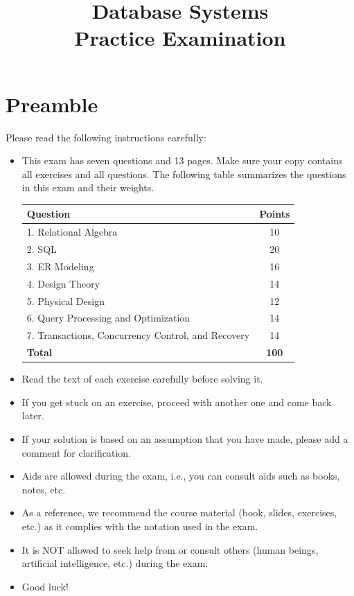 \documentclass[11pt,a4paper]{article}
\title{\textbf{Database Systems\\Practice Examination}}
\author{}
\date{}
\begin{document}
\maketitle
\thispagestyle{empty}

\section*{Preamble}

Please read the following instructions carefully:

\begin{itemize}
\item This exam has seven questions and 13 pages. Make sure your copy contains all exercises and all questions. The following table summarizes the questions in this exam and their weights.

\begin{center}
\begin{tabular}{|l|c|}
\hline
\textbf{Question} & \textbf{Points} \\
\hline
1. Relational Algebra & 10 \\
2. SQL & 20 \\
3. ER Modeling & 16 \\
4. Design Theory & 14 \\
5. Physical Design & 12 \\
6. Query Processing and Optimization & 14 \\
7. Transactions, Concurrency Control, and Recovery & 14 \\
\hline
\textbf{Total} & \textbf{100} \\
\hline
\end{tabular}
\end{center}

\item Read the text of each exercise carefully before solving it.
\item If you get stuck on an exercise, proceed with another one and come back later.
\item If your solution is based on an assumption that you have made, please add a comment for clarification.
\item Aids are allowed during the exam, i.e., you can consult aids such as books, notes, etc.
\item As a reference, we recommend the course material (book, slides, exercises, etc.) as it complies with the notation used in the exam.
\item It is NOT allowed to seek help from or consult others (human beings, artificial intelligence, etc.) during the exam.
\item Good luck!
\end{itemize}
\end{document}
